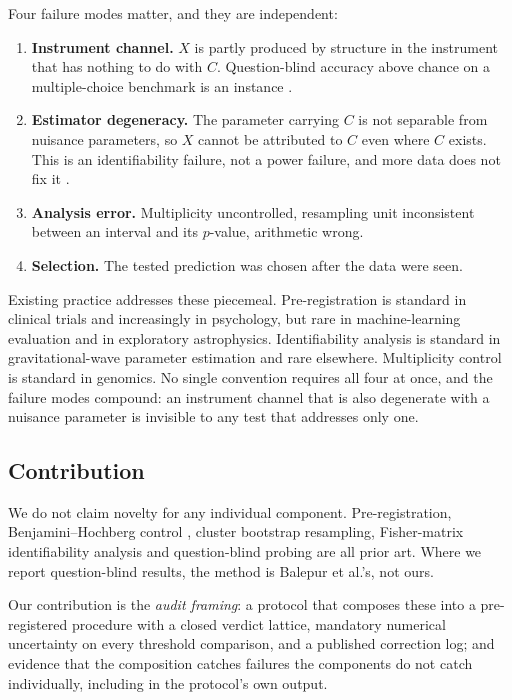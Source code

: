 \documentclass[11pt,a4paper]{article}
\begin{document}
Four failure modes matter, and they are independent:

\begin{enumerate}
\item \textbf{Instrument channel.} $X$ is partly produced by structure in the
instrument that has nothing to do with $C$. Question-blind accuracy above
chance on a multiple-choice benchmark is an instance
\cite{balepur2024artifacts}.
\item \textbf{Estimator degeneracy.} The parameter carrying $C$ is not
separable from nuisance parameters, so $X$ cannot be attributed to $C$ even
where $C$ exists. This is an identifiability failure, not a power failure, and
more data does not fix it \cite{vallisneri2008fisher}.
\item \textbf{Analysis error.} Multiplicity uncontrolled, resampling unit
inconsistent between an interval and its $p$-value, arithmetic wrong.
\item \textbf{Selection.} The tested prediction was chosen after the data were
seen.
\end{enumerate}

Existing practice addresses these piecemeal. Pre-registration is standard in
clinical trials and increasingly in psychology, but rare in machine-learning
evaluation and in exploratory astrophysics. Identifiability analysis is
standard in gravitational-wave parameter estimation and rare elsewhere.
Multiplicity control is standard in genomics. No single convention requires all
four at once, and the failure modes compound: an instrument channel that is
also degenerate with a nuisance parameter is invisible to any test that
addresses only one.

\subsection{Contribution}

We do not claim novelty for any individual component. Pre-registration,
Benjamini--Hochberg control \cite{benjamini1995controlling}, cluster bootstrap
resampling, Fisher-matrix identifiability analysis
\cite{cutler1994gravitational} and question-blind probing
\cite{balepur2024artifacts} are all prior art. Where we report question-blind
results, the method is Balepur et al.'s, not ours.

Our contribution is the \emph{audit framing}: a protocol that composes these
into a pre-registered procedure with a closed verdict lattice, mandatory
numerical uncertainty on every threshold comparison, and a published correction
log; and evidence that the composition catches failures the components do not
catch individually, including in the protocol's own output.
\end{document}
